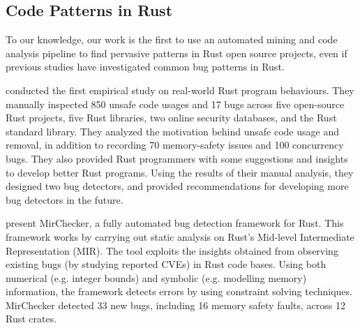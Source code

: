 \subsection{Code Patterns in Rust}

To our knowledge, our work is the first to use an automated mining and code analysis pipeline to find pervasive patterns in Rust open source projects, even if previous studies have investigated common bug patterns in Rust.

\cite{qin2020understanding} conducted the first empirical study on real-world Rust program behaviours. They manually inspected 850 unsafe code usages and 17 bugs across five open-source Rust projects, five Rust libraries, two online security databases, and the Rust standard library. They analyzed the motivation behind unsafe code usage and removal, in addition to recording 70 memory-safety issues and 100 concurrency bugs. They also provided Rust programmers with some suggestions and insights to develop better Rust programs. Using the results of their manual analysis, they designed two bug detectors, and provided recommendations for developing more bug detectors in the future.

\cite{li2021mirchecker} present MirChecker, a fully automated bug detection framework for Rust. This framework works by carrying out static analysis on Rust's Mid-level Intermediate Representation (MIR). The tool exploits the insights obtained from observing existing bugs (by studying reported CVEs) in Rust code bases. Using both numerical (e.g. integer bounds) and symbolic (e.g. modelling memory) information, the framework detects errors by using constraint solving techniques. MirChecker detected 33 new bugs, including 16 memory safety faults, across 12 Rust crates.

